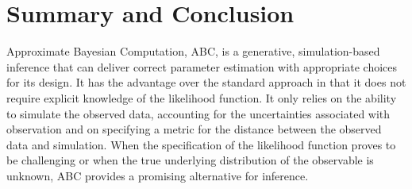 
\section{Summary and Conclusion}\label{sec:discussion}

Approximate Bayesian Computation, ABC, is a generative, simulation-based
inference that can deliver correct parameter estimation with
appropriate choices for its design.
It has the advantage over the standard approach in that it 
does not require explicit knowledge of the likelihood function. It only relies on the ability to simulate
the observed data, accounting for the uncertainties associated with observation and on specifying a metric 
for the distance between the observed data and simulation. When the specification of the likelihood function 
proves to be challenging or when the true underlying distribution of the observable is unknown, 
ABC provides a promising alternative for inference.


